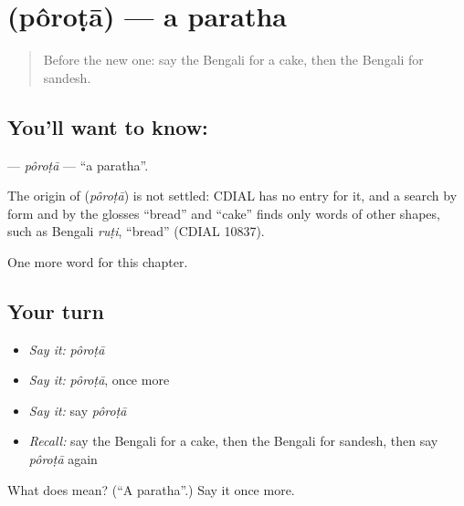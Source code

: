\section[\texorpdfstring{\bn{পরোটা} (pôroṭā)}{পরোটা (pôroṭā)}]{ (pôroṭā) — a paratha}

\label{lesson:BN-C165-porota}



\begin{quote}
Before the new one: say the Bengali for a cake, then the Bengali for sandesh.
\end{quote}

\subsection*{You'll want to know: }
\textbf{} — \emph{pôroṭā} — \textquotedblleft{}a paratha\textquotedblright{}.

\begin{cousinweb}
The origin of \textbf{} (\emph{pôroṭā}) is not settled: CDIAL has no entry for it, and a search by form and by the glosses \textquotedblleft{}bread\textquotedblright{} and \textquotedblleft{}cake\textquotedblright{} finds only words of other shapes, such as Bengali \emph{ruṭi}, \textquotedblleft{}bread\textquotedblright{} (CDIAL 10837).
\end{cousinweb}

\begin{grammarlens}[title={What you've built}]
One more word for this chapter.
\end{grammarlens}

\subsection*{Your turn}
\begin{itemize}
\raggedright
  \item \emph{Say it:} \emph{pôroṭā}
  \item \emph{Say it:} \emph{pôroṭā}, once more
  \item \emph{Say it:} say \emph{pôroṭā}
  \item \emph{Recall:} say the Bengali for a cake, then the Bengali for sandesh, then say \emph{pôroṭā} again
\end{itemize}

\begin{tcolorbox}[breakable,colback=teal!4,colframe=teal!35!black,title={Before you move on}]
What does  mean? (\textquotedblleft{}A paratha\textquotedblright{}.) Say it once more.
\end{tcolorbox}

